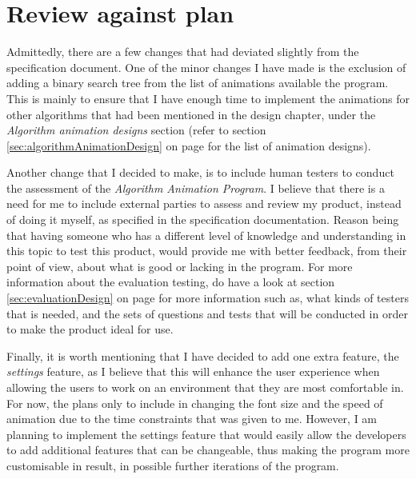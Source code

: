 \chapter{Review against plan}



Admittedly, there are a few changes that had deviated slightly from the specification document. One of the minor changes I have made is the exclusion of adding a binary search tree from the list of animations available the program. This is mainly to ensure that I have enough time to implement the animations for other algorithms that had been mentioned in the design chapter, under the \textit{Algorithm animation designs} section (refer to section \ref{sec:algorithmAnimationDesign} on page \pageref{sec:algorithmAnimationDesign} for the list of animation designs).

Another change that I decided to make, is to include human testers to conduct the assessment of the \textit{Algorithm Animation Program}. I believe that there is a need for me to include external parties to assess and review my product, instead of doing it myself, as specified in the specification documentation. Reason being that having someone who has a different level of knowledge and understanding in this topic to test this product, would provide me with better feedback, from their point of view, about what is good or lacking in the program. For more information about the evaluation testing, do have a look at section \ref{sec:evaluationDesign} on page \pageref{sec:evaluationDesign} for more information such as, what kinds of testers that is needed, and the sets of questions and tests that will be conducted in order to make the product ideal for use.

Finally, it is worth mentioning that I have decided to add one extra feature, the \textit{settings} feature, as I believe that this will enhance the user experience when allowing the users to work on an environment that they are most comfortable in. For now, the plans only to include in changing the font size and the speed of animation due to the time constraints that was given to me. However, I am planning to implement the settings feature that would easily allow the developers to add additional features that can be changeable, thus making the program more customisable in result, in possible further iterations of the program.

\newpage